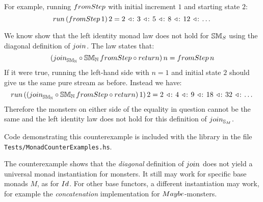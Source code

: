 For example, running $\fromstepstr$ with initial increment $1$ and starting state $2$:
$$
\strun\,(\fromstepstr\, 1)\, 2 = 2\, \acons\, 3\, \acons\, 5\, \acons\, 8\, \acons\, 12\, \acons\, \dots
$$

We know show that the left identity monad law does not hold for $\mathbb{SM}_{S}$ using the diagonal definition of $\join$.
The law states that:
$$
(\join_{\stmon{\nat}} \comp \stmon{\nat}\, \fromstepstr \comp \return)\, n = \fromstepstr\, n
$$
If it were true, running the left-hand side with $n = 1$ and initial state $2$ should give us the same pure stream as before.
Instead we have:
$$
\strun\, ((\join_{\stmon{\nat}} \comp \stmon{\nat}\, \fromstepstr \comp \return)\, 1)\, 2 = 2\, \acons\, 4\, \acons\, 9\, \acons\, 18\, \acons\, 32\, \acons\, \dots
$$
Therefore the monsters on either side of the equality in question cannot be the same and the left identity law does not hold for this definition of $\join_{\stream{M}}$.

Code demonstrating this counterexample is included with the library in the file {\tt Tests/MonadCounterExamples.hs}.

The counterexample shows that the {\em diagonal} definition of $\join$ does not yield a universal monad instantiation for monsters. 
It still may work for specific base monads $M$, as for $\Id$.
For other base functors, a different instantiation may work, for example the {\em concatenation} implementation for $\maybe$-monsters.
